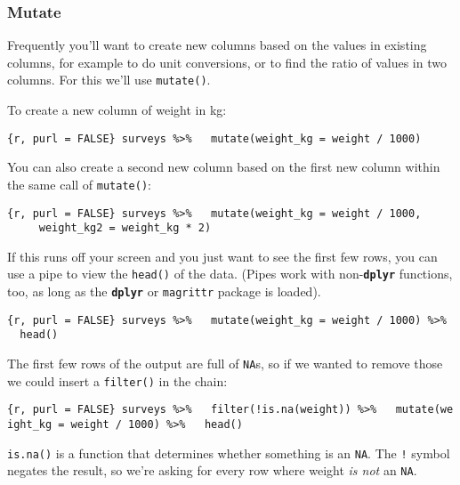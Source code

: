 \documentclass[]{article}
\begin{document}
\subsubsection{Mutate}\label{mutate}

Frequently you'll want to create new columns based on the values in
existing columns, for example to do unit conversions, or to find the
ratio of values in two columns. For this we'll use \texttt{mutate()}.

To create a new column of weight in kg:

\texttt{\{r,\ purl\ =\ FALSE\}\ surveys\ \%\textgreater{}\%\ \ \ mutate(weight\_kg\ =\ weight\ /\ 1000)}

You can also create a second new column based on the first new column
within the same call of \texttt{mutate()}:

\texttt{\{r,\ purl\ =\ FALSE\}\ surveys\ \%\textgreater{}\%\ \ \ mutate(weight\_kg\ =\ weight\ /\ 1000,\ \ \ \ \ \ \ \ \ \ weight\_kg2\ =\ weight\_kg\ *\ 2)}

If this runs off your screen and you just want to see the first few
rows, you can use a pipe to view the \texttt{head()} of the data. (Pipes
work with non-\textbf{\texttt{dplyr}} functions, too, as long as the
\textbf{\texttt{dplyr}} or \texttt{magrittr} package is loaded).

\texttt{\{r,\ purl\ =\ FALSE\}\ surveys\ \%\textgreater{}\%\ \ \ mutate(weight\_kg\ =\ weight\ /\ 1000)\ \%\textgreater{}\%\ \ \ head()}

The first few rows of the output are full of \texttt{NA}s, so if we
wanted to remove those we could insert a \texttt{filter()} in the chain:

\texttt{\{r,\ purl\ =\ FALSE\}\ surveys\ \%\textgreater{}\%\ \ \ filter(!is.na(weight))\ \%\textgreater{}\%\ \ \ mutate(weight\_kg\ =\ weight\ /\ 1000)\ \%\textgreater{}\%\ \ \ head()}

\texttt{is.na()} is a function that determines whether something is an
\texttt{NA}. The \texttt{!} symbol negates the result, so we're asking
for every row where weight \emph{is not} an \texttt{NA}.
\end{document}
